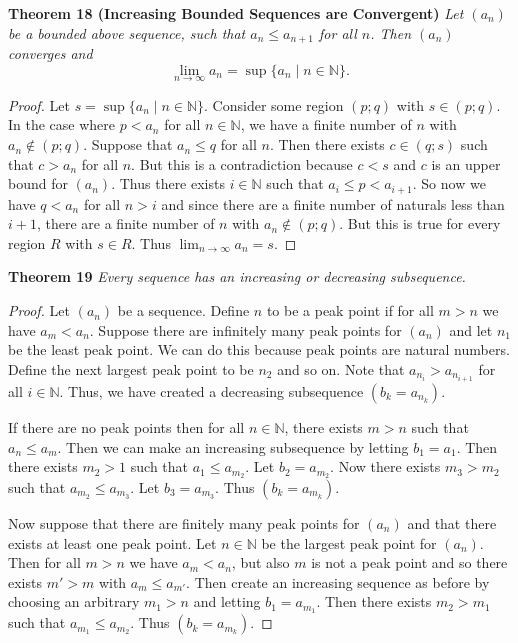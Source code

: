 \documentclass{article}
\begin{document}
\begin{flushleft}
\textbf{Theorem 18 (Increasing Bounded Sequences are Convergent)}
\textsl{Let $(a_n)$ be a bounded above sequence, such that $a_n \leq a_{n+1}$ for all $n$. Then $(a_n)$ converges and
\[
\lim_{n \rightarrow \infty} a_n = \sup \{a_n \mid n \in \mathbb{N}\}.
\]}
\begin{proof}
Let $s = \sup \{a_n \mid n \in \mathbb{N}\}$. Consider some region $(p;q)$ with $s \in (p;q)$. In the case where $p < a_n$ for all $n \in \mathbb{N}$, we have a finite number of $n$ with $a_n \notin (p;q)$. Suppose that $a_n \leq q$ for all $n$. Then there exists $c \in (q;s)$ such that $c > a_n$ for all $n$. But this is a contradiction because $c < s$ and $c$ is an upper bound for $(a_n)$. Thus there exists $i \in \mathbb{N}$ such that $a_i \leq p < a_{i+1}$. So now we have $q < a_n$ for all $n > i$ and since there are a finite number of naturals less than $i+1$, there are a finite number of $n$ with $a_n \notin (p;q)$. But this is true for every region $R$ with $s \in R$. Thus $\lim_{n \rightarrow \infty} a_n = s$.
\end{proof}

\textbf{Theorem 19}
\textsl{Every sequence has an increasing or decreasing subsequence.}
\begin{proof}
Let $(a_n)$ be a sequence. Define $n$ to be a peak point if for all $m>n$ we have $a_m < a_n$. Suppose there are infinitely many peak points for $(a_n)$ and let $n_1$ be the least peak point. We can do this because peak points are natural numbers. Define the next largest peak point to be $n_2$ and so on. Note that $a_{n_i} > a_{n_{i+1}}$ for all $i \in \mathbb{N}$. Thus, we have created a decreasing subsequence $(b_k = a_{n_k})$.\newline

If there are no peak points then for all $n \in \mathbb{N}$, there exists $m>n$ such that $a_n \leq a_m$. Then we can make an increasing subsequence by letting $b_1 = a_1$. Then there exists $m_2 > 1$ such that $a_1 \leq a_{m_2}$. Let $b_2 = a_{m_2}$. Now there exists $m_3 > m_2$ such that $a_{m_2} \leq a_{m_3}$. Let $b_3 = a_{m_3}$. Thus $(b_k = a_{m_k})$.\newline

Now suppose that there are finitely many peak points for $(a_n)$ and that there exists at least one peak point. Let $n \in \mathbb{N}$ be the largest peak point for $(a_n)$. Then for all $m>n$ we have $a_m < a_n$, but also $m$ is not a peak point and so there exists $m' > m$ with $a_m \leq a_{m'}$. Then create an increasing sequence as before by choosing an arbitrary $m_1>n$ and letting $b_1 = a_{m_1}$. Then there exists $m_2 > m_1$ such that $a_{m_1} \leq a_{m_2}$. Thus $(b_k = a_{m_k})$.
\end{proof}

\end{flushleft}
\end{document}
